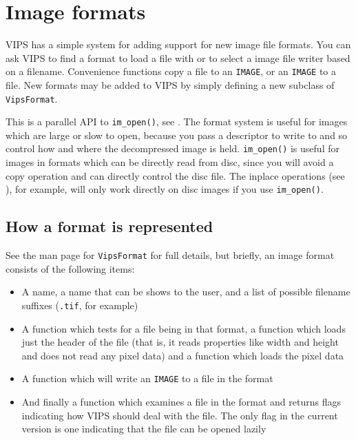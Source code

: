 \section{Image formats}
\label{sec:format}

VIPS has a simple system for adding support for new image file formats. 
You can ask VIPS to find a format to load a file with
or to select a image file writer based on a filename. Convenience functions
copy a file to an \verb+IMAGE+, or an \verb+IMAGE+ to a file. New formats may
be added to VIPS by simply defining a new subclass of \verb+VipsFormat+.

This is a parallel API to \verb+im_open()+, see . The
format system is useful for images which are large or slow to open,
because you pass a descriptor to write to and so control how and where
the decompressed image is held. \verb+im_open()+ is useful for images in
formats which can be directly read from disc, since you will avoid a copy
operation and can directly control the disc file. The inplace operations
(see ), for example, will only work directly on disc
images if you use \verb+im_open()+.

\subsection{How a format is represented}

See the man page for \verb+VipsFormat+ for full details, but briefly, an image
format consists of the following items:

\begin{itemize}
\item
A name, a name that can be shows to the user, and a list of possible filename
suffixes (\verb+.tif+, for example)

\item
A function which tests for a file being in that format, a function which loads 
just the header of the file (that is, it reads properties like width and
height and does not read any pixel data) and a function which loads the pixel
data

\item
A function which will write an \verb+IMAGE+ to a file in the format

\item
And finally a function which examines a file in the format and returns flags
indicating how VIPS should deal with the file. The only flag in the current
version is one indicating that the file can be opened lazily

\end{itemize}

